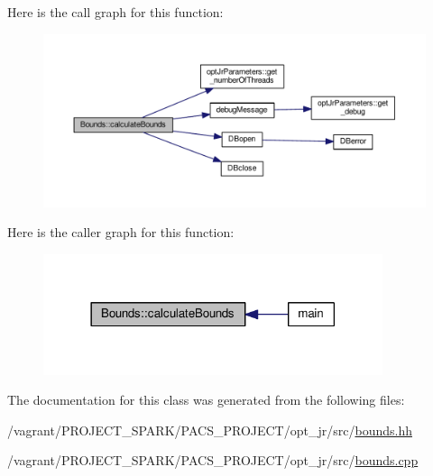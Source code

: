 Here is the call graph for this function\-:\nopagebreak
\begin{figure}[H]
\begin{center}
\leavevmode
\includegraphics[width=350pt]{classBounds_adea89543a39dfa00bee2e4aa3f58e5e0_cgraph}
\end{center}
\end{figure}




Here is the caller graph for this function\-:\nopagebreak
\begin{figure}[H]
\begin{center}
\leavevmode
\includegraphics[width=282pt]{classBounds_adea89543a39dfa00bee2e4aa3f58e5e0_icgraph}
\end{center}
\end{figure}




The documentation for this class was generated from the following files\-:\begin{DoxyCompactItemize}
\item 
/vagrant/\-P\-R\-O\-J\-E\-C\-T\-\_\-\-S\-P\-A\-R\-K/\-P\-A\-C\-S\-\_\-\-P\-R\-O\-J\-E\-C\-T/opt\-\_\-jr/src/\hyperlink{bounds_8hh}{bounds.\-hh}\item 
/vagrant/\-P\-R\-O\-J\-E\-C\-T\-\_\-\-S\-P\-A\-R\-K/\-P\-A\-C\-S\-\_\-\-P\-R\-O\-J\-E\-C\-T/opt\-\_\-jr/src/\hyperlink{bounds_8cpp}{bounds.\-cpp}\end{DoxyCompactItemize}
